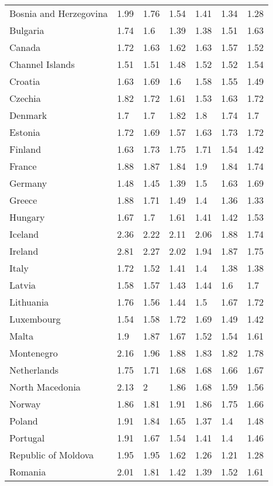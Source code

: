 \begin{longtable}[t]{lllllll}
Bosnia and Herzegovina & 1.99 & 1.76 & 1.54 & 1.41 & 1.34 & 1.28\\
Bulgaria & 1.74 & 1.6 & 1.39 & 1.38 & 1.51 & 1.63\\
Canada & 1.72 & 1.63 & 1.62 & 1.63 & 1.57 & 1.52\\
Channel Islands & 1.51 & 1.51 & 1.48 & 1.52 & 1.52 & 1.54\\
Croatia & 1.63 & 1.69 & 1.6 & 1.58 & 1.55 & 1.49\\
Czechia & 1.82 & 1.72 & 1.61 & 1.53 & 1.63 & 1.72\\
Denmark & 1.7 & 1.7 & 1.82 & 1.8 & 1.74 & 1.7\\
Estonia & 1.72 & 1.69 & 1.57 & 1.63 & 1.73 & 1.72\\
Finland & 1.63 & 1.73 & 1.75 & 1.71 & 1.54 & 1.42\\
France & 1.88 & 1.87 & 1.84 & 1.9 & 1.84 & 1.74\\
Germany & 1.48 & 1.45 & 1.39 & 1.5 & 1.63 & 1.69\\
Greece & 1.88 & 1.71 & 1.49 & 1.4 & 1.36 & 1.33\\
Hungary & 1.67 & 1.7 & 1.61 & 1.41 & 1.42 & 1.53\\
Iceland & 2.36 & 2.22 & 2.11 & 2.06 & 1.88 & 1.74\\
Ireland & 2.81 & 2.27 & 2.02 & 1.94 & 1.87 & 1.75\\
Italy & 1.72 & 1.52 & 1.41 & 1.4 & 1.38 & 1.38\\
Latvia & 1.58 & 1.57 & 1.43 & 1.44 & 1.6 & 1.7\\
Lithuania & 1.76 & 1.56 & 1.44 & 1.5 & 1.67 & 1.72\\
Luxembourg & 1.54 & 1.58 & 1.72 & 1.69 & 1.49 & 1.42\\
Malta & 1.9 & 1.87 & 1.67 & 1.52 & 1.54 & 1.61\\
Montenegro & 2.16 & 1.96 & 1.88 & 1.83 & 1.82 & 1.78\\
Netherlands & 1.75 & 1.71 & 1.68 & 1.68 & 1.66 & 1.67\\
North Macedonia & 2.13 & 2 & 1.86 & 1.68 & 1.59 & 1.56\\
Norway & 1.86 & 1.81 & 1.91 & 1.86 & 1.75 & 1.66\\
Poland & 1.91 & 1.84 & 1.65 & 1.37 & 1.4 & 1.48\\
Portugal & 1.91 & 1.67 & 1.54 & 1.41 & 1.4 & 1.46\\
Republic of Moldova & 1.95 & 1.95 & 1.62 & 1.26 & 1.21 & 1.28\\
Romania & 2.01 & 1.81 & 1.42 & 1.39 & 1.52 & 1.61\\

\end{longtable}

